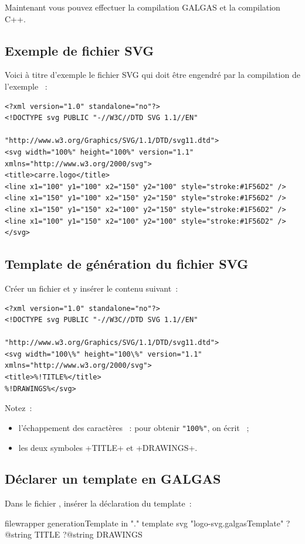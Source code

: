 Maintenant vous pouvez effectuer la compilation GALGAS et la compilation C++.

\subsection{Exemple de fichier SVG}
Voici à titre d'exemple le fichier SVG qui doit être engendré par la compilation de l'exemple ~:

{\singlespacing
\begin{verbatim}
<?xml version="1.0" standalone="no"?>
<!DOCTYPE svg PUBLIC "-//W3C//DTD SVG 1.1//EN"
                              "http://www.w3.org/Graphics/SVG/1.1/DTD/svg11.dtd">
<svg width="100%" height="100%" version="1.1" xmlns="http://www.w3.org/2000/svg">
<title>carre.logo</title>
<line x1="100" y1="100" x2="150" y2="100" style="stroke:#1F56D2" />
<line x1="150" y1="100" x2="150" y2="150" style="stroke:#1F56D2" />
<line x1="150" y1="150" x2="100" y2="150" style="stroke:#1F56D2" />
<line x1="100" y1="150" x2="100" y2="100" style="stroke:#1F56D2" />
</svg>
\end{verbatim}
}

\subsection{Template de génération du fichier SVG}
Créer un fichier  et y insérer le contenu suivant~:
{\singlespacing
\begin{verbatim}
<?xml version="1.0" standalone="no"?>
<!DOCTYPE svg PUBLIC "-//W3C//DTD SVG 1.1//EN"
                                "http://www.w3.org/Graphics/SVG/1.1/DTD/svg11.dtd">
<svg width="100\%" height="100\%" version="1.1" xmlns="http://www.w3.org/2000/svg">
<title>%!TITLE%</title>
%!DRAWINGS%</svg>
\end{verbatim}
}


Notez~:
\begin{itemize}
  \item l'échappement des caractères \tpp{\%}~: pour obtenir \texttt{"100\%"}, on écrit ~;
  \item les deux symboles \ggs+TITLE+ et \ggs+DRAWINGS+.
\end{itemize}

\subsection{Déclarer un template en GALGAS}
Dans le fichier , insérer la déclaration du template~:
\begin{galgas}
filewrapper generationTemplate in "." {
}{
}{
  template svg "logo-svg.galgasTemplate"
    ?@string TITLE
    ?@string DRAWINGS
}
\end{galgas}


